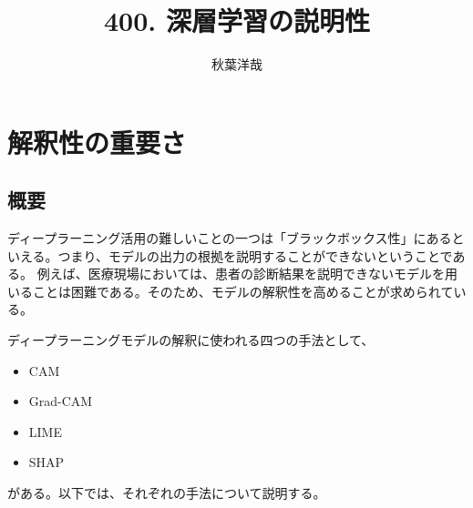 \documentclass{ltjsarticle}
\begin{document}
\title{400. 深層学習の説明性}
\author{秋葉洋哉}
\maketitle

\section{解釈性の重要さ}
\subsection{概要}
ディープラーニング活用の難しいことの一つは「ブラックボックス性」にあるといえる。つまり、モデルの出力の根拠を説明することができないということである。
例えば、医療現場においては、患者の診断結果を説明できないモデルを用いることは困難である。そのため、モデルの解釈性を高めることが求められている。
\par
ディープラーニングモデルの解釈に使われる四つの手法として、
\begin{itemize}
  \item CAM
  \item Grad-CAM
  \item LIME
  \item SHAP
\end{itemize}
がある。以下では、それぞれの手法について説明する。
\end{document}
